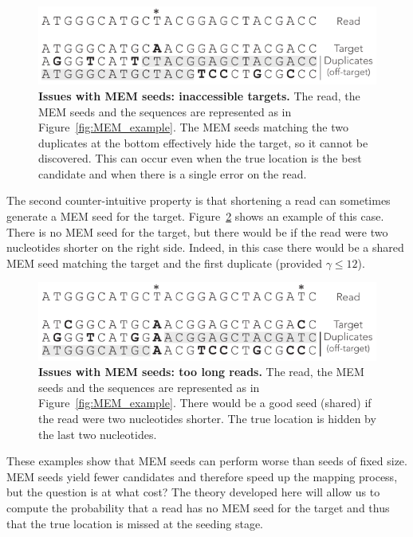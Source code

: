 \documentclass{article}
\begin{document}
\begin{figure}[h]
\centering
\includegraphics[scale=1]{full_masking_example.pdf}
\caption{\textbf{Issues with MEM seeds: inaccessible targets.}
The read, the MEM seeds and the sequences are represented as in
Figure~\ref{fig:MEM_example}. The MEM seeds matching the two duplicates
at the bottom effectively hide the target, so it cannot be discovered.
This can occur even when the true location is the best candidate and when
there is a single error on the read.}
\label{fig:full_masking_example}
\end{figure}

The second counter-intuitive property is that shortening a read can
sometimes generate a MEM seed for the target. Figure~\ref{fig:short_vs_long}
shows an example of this case. There is no MEM seed for the target, but
there would be if the read were two nucleotides shorter on the right
side. Indeed, in this case there would be a shared MEM seed matching
the target and the first duplicate (provided $\gamma \leq 12$).


\begin{figure}[h]
\centering
\includegraphics[scale=1]{short_vs_long_example.pdf}
\caption{\textbf{Issues with MEM seeds: too long reads.}
The read, the MEM seeds and the sequences are represented as in
Figure~\ref{fig:MEM_example}. There would be a good seed (shared) if the
read were two nucleotides shorter. The true location is hidden by
the last two nucleotides.}
\label{fig:short_vs_long}
\end{figure}

These examples show that MEM seeds can perform worse than seeds of fixed
size. MEM seeds yield fewer candidates and therefore speed up the mapping
process, but the question is at what cost? The theory developed here will
allow us to compute the probability that a read has no MEM seed for the
target and thus that the true location is missed at the seeding stage.
\end{document}
